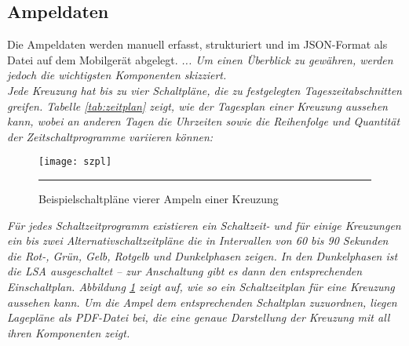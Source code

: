 \subsection{Ampeldaten}
Die Ampeldaten werden manuell erfasst, strukturiert und im \gls{JSON}-Format als Datei auf dem Mobilgerät abgelegt.
\textit{... Um einen Überblick zu gewähren, werden jedoch die wichtigsten Komponenten skizziert.\\ 
Jede Kreuzung hat bis zu vier Schaltpläne, die zu festgelegten Tageszeitabschnitten greifen. Tabelle \ref{tab:zeitplan} zeigt, wie der Tagesplan einer Kreuzung aussehen kann, wobei an anderen Tagen die Uhrzeiten sowie die Reihenfolge und Quantität der Zeitschaltprogramme variieren können:}
\begin{figure}[H]
\centering
	\begin{minipage}[b]{0.29\textwidth}	
		\label{tab:zeitplan}
	\end{minipage} \hfill
%
	\begin{minipage}[b]{0.6\textwidth}
		\texttt{[image: szpl]}
		\label{fig:plan}
	\end{minipage}
	\rule{35em}{0.5pt}
	\caption{Beispielschaltpläne vierer Ampeln einer Kreuzung}	
\end{figure}
\textit{Für jedes Schaltzeitprogramm existieren ein Schaltzeit- und für einige Kreuzungen ein bis zwei Alternativschaltzeitpläne die in Intervallen von 60 bis 90 Sekunden die Rot-, Grün, Gelb, Rotgelb und Dunkelphasen zeigen. In den Dunkelphasen ist die \gls{LSA} ausgeschaltet -- zur Anschaltung gibt es dann den entsprechenden Einschaltplan. Abbildung \ref{fig:plan} zeigt auf, wie so ein Schaltzeitplan für eine Kreuzung aussehen kann. Um die Ampel dem entsprechenden Schaltplan zuzuordnen, liegen Lagepläne als \gls{PDF}-Datei bei, die eine genaue Darstellung der Kreuzung mit all ihren Komponenten zeigt. }
